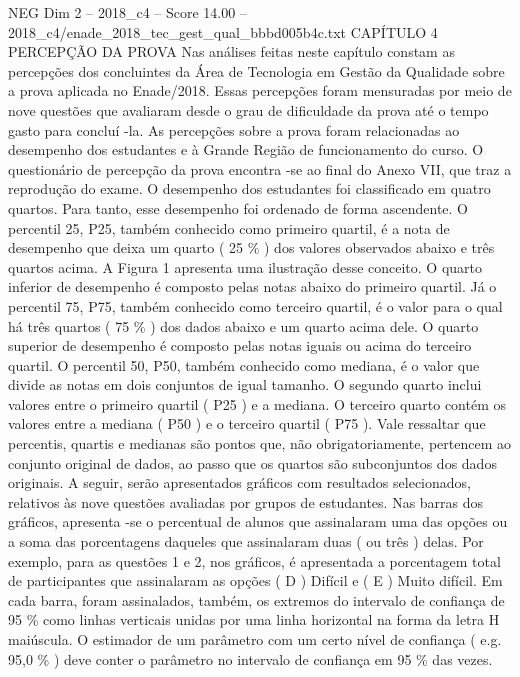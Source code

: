 \begin{textsample}{NEG Dim 2 – 2018\_c4 – Score 14.00 – 2018\_c4/enade\_2018\_tec\_gest\_qual\_bbbd005b4c.txt}  \label{ex:f2_neg_375}
CAPÍTULO 4 PERCEPÇÃO DA PROVA Nas análises feitas neste capítulo constam as percepções dos concluintes da Área de Tecnologia em Gestão da Qualidade sobre a prova aplicada no Enade/2018.
Essas percepções foram mensuradas por meio de nove questões que avaliaram desde o grau de dificuldade da prova até o tempo gasto para concluí -la.
As percepções sobre a prova foram relacionadas ao desempenho dos estudantes e à Grande Região de funcionamento do curso.
O questionário de percepção da prova encontra -se ao final do Anexo VII, que traz a reprodução do exame.
O desempenho dos estudantes foi classificado em quatro quartos.
Para tanto, esse desempenho foi ordenado de forma ascendente.
O percentil 25, P25, também conhecido como primeiro quartil, é a nota de desempenho que deixa um quarto ( 25 \% ) dos valores observados abaixo e três quartos acima.
A Figura 1 apresenta uma ilustração desse conceito.
O quarto inferior de desempenho é composto pelas notas abaixo do primeiro quartil.
Já o percentil 75, P75, também conhecido como terceiro quartil, é o valor para o qual há três quartos ( 75 \% ) dos dados abaixo e um quarto acima dele.
O quarto superior de desempenho é composto pelas notas iguais ou acima do terceiro quartil.
O percentil 50, P50, também conhecido como mediana, é o valor que divide as notas em dois conjuntos de igual tamanho.
O segundo quarto inclui valores entre o primeiro quartil ( P25 ) e a mediana.
O terceiro quarto contém os valores entre a mediana ( P50 ) e o terceiro quartil ( P75 ).
Vale ressaltar que percentis, quartis e medianas são pontos que, não obrigatoriamente, pertencem ao conjunto original de dados, ao passo que os quartos são subconjuntos dos dados originais.
A seguir, serão apresentados gráficos com resultados selecionados, relativos às nove questões avaliadas por grupos de estudantes.
Nas barras dos gráficos, apresenta -se o percentual de alunos que assinalaram uma das opções ou a soma das porcentagens daqueles que assinalaram duas ( ou três ) delas.
Por exemplo, para as questões 1 e 2, nos gráficos, é apresentada a porcentagem total de participantes que assinalaram as opções ( D ) Difícil e ( E ) Muito difícil.
Em cada barra, foram assinalados, também, os extremos do intervalo de confiança de 95 \% como linhas verticais unidas por uma linha horizontal na forma da letra H maiúscula.
O estimador de um parâmetro com um certo nível de confiança ( e.g. 95,0 \% ) deve conter o parâmetro no intervalo de confiança em 95 \% das vezes.

\end{textsample}
